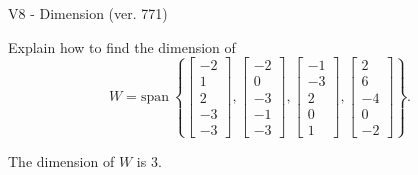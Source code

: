 \begin{exercise}
  \begin{exerciseTitle}V8 - Dimension (ver. 771)\end{exerciseTitle}
  \begin{exerciseStatement}
    Explain how to find the dimension of 
\[W=\mathrm{span}\ \left\{\left[\begin{array}{r}
-2 \\
1 \\
2 \\
-3 \\
-3
\end{array}\right] , \left[\begin{array}{r}
-2 \\
0 \\
-3 \\
-1 \\
-3
\end{array}\right] , \left[\begin{array}{r}
-1 \\
-3 \\
2 \\
0 \\
1
\end{array}\right] , \left[\begin{array}{r}
2 \\
6 \\
-4 \\
0 \\
-2
\end{array}\right]\right\}.\]



  \end{exerciseStatement}
  \begin{exerciseAnswer}
   The dimension of \(W\) is  \(3\).
  


  \end{exerciseAnswer}
\end{exercise}